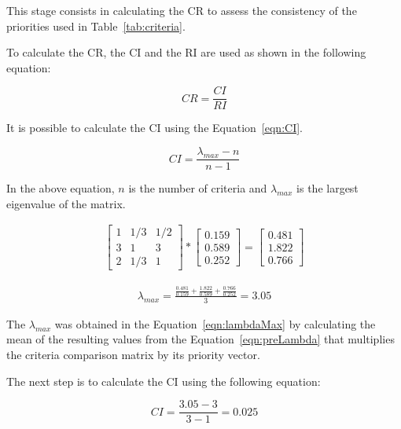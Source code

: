This stage consists in calculating the \gls{CR} to assess the consistency of the priorities used in Table~\ref{tab:criteria}.

To calculate the \gls{CR}, the \gls{CI} and the \gls{RI} are used as shown in the following equation:

\begin{equation}
    CR = \frac{CI}{RI}
\end{equation}

It is possible to calculate the \gls{CI} using the Equation~\ref{eqn:CI}.

\begin{equation}
    \label{eqn:CI}
    CI = \frac{\lambda_{max}-n}{n-1}
\end{equation}

In the above equation, $n$ is the number of criteria and $\lambda_{max}$ is the largest eigenvalue of the matrix.

\begin{gather}
    \label{eqn:preLambda}
    \begin{bmatrix}
        1 & 1/3 & 1/2 \\
        3 & 1 & 3 \\
        2 & 1/3 & 1
    \end{bmatrix}
    *
    \begin{bmatrix}
      0.159 \\
      0.589 \\
      0.252
    \end{bmatrix}
      =
    \begin{bmatrix}
      0.481 \\
      1.822 \\
      0.766
    \end{bmatrix}
\end{gather}


\begin{gather}
    \label{eqn:lambdaMax}
    \lambda_{max} =
    \frac{\frac{0.481}{0.159} + \frac{1.822}{0.589} + \frac{0.766}{0.252}}{3}
    = 3.05
\end{gather}

The $\lambda_{max}$ was obtained in the Equation~\ref{eqn:lambdaMax} by calculating the mean of the resulting values from the Equation~\ref{eqn:preLambda} that multiplies the criteria comparison matrix by its priority vector.

The next step is to calculate the \gls{CI} using the following equation:

\begin{equation}
    CI = \frac{3.05-3}{3-1} = 0.025
\end{equation}

